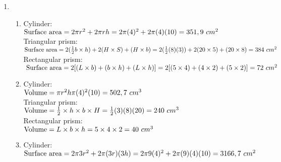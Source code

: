  \begin{eocsolutions}{}{
\begin{enumerate}[itemsep=5pt, label=\textbf{\arabic*}. ] 
\item \begin{enumerate}[itemsep=5pt, label=\textbf{\alph*}. ]
       \item Cylinder: \\
$\text{Surface area} = 2 \pi r^2 + 2 \pi rh \\
= 2 \pi (4)^2 + 2 \pi(4)(10) \\
= 351,9 ~cm^{2}$\\

Triangular prism:  \\
$\text{Surface area} = 2(\frac{1}{2}b \times h) + 2(H \times S) + (H \times b)\\
= 2(\frac{1}{2}(8)(3)) + 2(20 \times 5) + (20 \times 8)\\
= 384 ~cm^{2}$\\

Rectangular prism:\\
$\text{ Surface area} = 2[(L \times b) + (b \times h) + (L \times h)] \\
= 2[(5 \times 4) + (4 \times 2) + (5 \times 2)] \\
= 72 ~cm^{2}$

\item Cylinder: \\
$\text{Volume} = \pi r^2 h \\
\pi (4)^2(10)\\
= 502,7 ~cm^{3}$ \\

Triangular prism:  \\
$\text{Volume} = \frac{1}{2} \times h \times b \times H\\
= \frac{1}{2}(3)(8)(20)\\
= 240 ~cm^{3}$ \\

Rectangular prism:\\
$\text{Volume} = L \times b \times h\\
= 5 \times 4 \times 2 \\
= 40 ~ cm^{3}$ 

\item Cylinder: \\
$\text{Surface area} = 2 \pi 3r^2 + 2 \pi (3r)(3h) \\
= 2 \pi 9(4)^2 + 2 \pi(9)(4)(10) \\
= 3166,7 ~cm^{2}$\\


\end{enumerate}
\end{enumerate}}
\end{eocsolutions}
